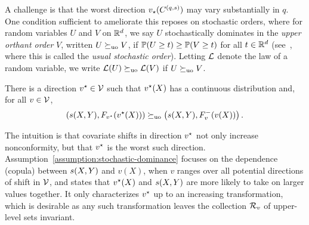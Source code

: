 
A challenge is that the worst direction $v\subopt(C^{(q,\score)})$ may vary substantially in $q$.  One condition sufficient to ameliorate this reposes on stochastic orders, where for random variables $U$ and $V$ on
$\R^d$, we say $U$ stochastically dominates in the \emph{upper orthant order} $V$, written $U \stocuo V$,
if $\P(U \ge t) \ge \P(V \ge t)$ for all $t \in \R^d$ (see~\cite[Ch.~6]{ShakedSh07}, where this is called the
\emph{usual stochastic order}).  
Letting $\mc{L}$ denote the law of a random variable, we write $\law(U) \stocuo \law(V)$ if $U \stocuo V$.

\begin{assumption}
  \label{assumption:stochastic-dominance}
  There is a direction $v\opt \in \mc{V}$ such that $v\opt(X)$ has a continuous distribution and,  for all $v \in \mc{V}$, 
  \begin{equation*}
    \left( \score(X,Y), F_{v\opt}(v\opt(X)) \right) \stocuo  \left( \score(X,Y), F_{v}^-(v(X)) \right).
  \end{equation*}
\end{assumption}
\noindent
The intuition is that covariate shifts in direction
$v\opt$ not only increase nonconformity,  but that $v\opt$ is the worst such direction.
Assumption~\ref{assumption:stochastic-dominance} focuses on the dependence (copula) between $\score(X,Y)$ and $v(X)$, when $v$ ranges over all potential directions of shift in $\mc{V}$, and states that $v\opt(X)$ and $\score(X,Y)$ are more likely to take on larger values together. 
It only characterizes $v\opt$ up to an increasing transformation,  which is desirable as any such transformation leaves the collection $\mc{R}_v$ of upper-level sets invariant.

